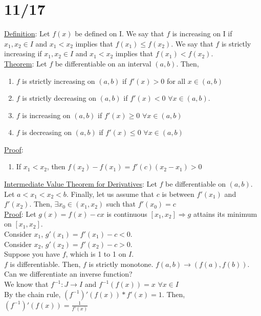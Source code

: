 \documentclass[11pt]{article}
\begin{document}
\section*{11/17}
	\underline{Definition}: Let $f(x)$ be defined on I. We say that $f$ is 
	increasing on I if $x_1, x_2 \in I$ and $x_1 < x_2$ implies that $f(x_1)
	\le f(x_2)$. We say that $f$ is strictly increasing if $x_1, x_2 \in I$
	and $x_1 < x_2$ implies that $f(x_1) < f(x_2)$.\\
	\underline{Theorem}: Let $f$ be differentiable on an interval $(a,b)$.
	Then, 
	\begin{enumerate}
		\item $f$ is strictly increasing on $(a,b)$ if $f'(x) > 0$ for all
		$x \in (a,b)$
		\item $f$ is strictly decreasing on $(a,b)$ if $f'(x) < 0$ $\forall x \in
		(a,b)$.
		\item $f$ is increasing on $(a,b)$ if $f'(x) \ge 0$ $\forall x \in (a,b)$
		\item $f$ is decreasing on $(a,b)$ if $f'(x) \le 0$ $\forall x \in (a,b)$
	\end{enumerate}
	\underline{Proof}:
	\begin{enumerate}
		\item If $x_1 < x_2$, then $f(x_2) - f(x_1) = f'(c)(x_2 - x_1) > 0$
	\end{enumerate}
	\underline{Intermediate Value Theorem for Derivatives}: Let $f$ be
	differentiable on $(a,b)$. Let $a < x_1 < x_2 < b$. Finally, let us assume
	that $c$ is between $f'(x_1)$ and $f'(x_2)$. Then, $\exists x_0 \in 
	(x_1, x_2)$ such that $f'(x_0) = c$\\
	\underline{Proof}: Let $g(x) = f(x) - cx$ is continuous $[x_1, x_2] 
	\Rightarrow g$ attains its minimum on $[x_1, x_2]$.\\
	Consider $x_1$, $g'(x_1) = f'(x_1) - c < 0$.\\
	Consider $x_2$, $g'(x_2) = f'(x_2) - c > 0$.\\
	Suppose you have $f$, which is 1 to 1 on $I$.\\
	$f$ is differentiable. Then, $f$ is strictly monotone. $f(a,b) \rightarrow
	(f(a), f(b))$.\\
	Can we differentiate an inverse function?\\
	We know that $f^{-1}: J \to I$ and $f^{-1}(f(x)) = x$ $\forall x \in I$\\
	By the chain rule, $(f^{-1})'(f(x)) * f'(x) = 1$. Then, $(f^{-1})'(f(x)) = 
	\frac{1}{f'(x)}$
\end{document}
